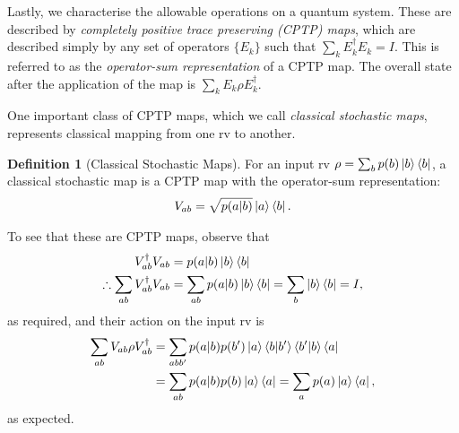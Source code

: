 \documentclass[10pt, a4paper]{article}
\numberwithin{equation}{section} %
\newcounter{stmt} %
\theoremstyle{definition}
\newtheorem{defn}[stmt]{Definition}
\theoremstyle{plain}
\newcommand{\?}{\mathrel{?}} %
\begin{document}
\begin{appendices}
                          Lastly, we characterise the allowable operations on a quantum system. These are described by \emph{completely positive trace preserving (CPTP) maps}, which are described simply by any set of operators \(\{E_k\}\) such that \(\sum_k E_k^{\dagger}E_k = I\). This is referred to as the \emph{operator-sum representation} of a CPTP map. The overall state after the application of the map is \(\sum_k E_k \rho E_k^{\dagger}\).

                          One important class of CPTP maps, which we call \emph{classical stochastic maps}, represents classical mapping from one rv to another. 
                          \begin{defn}[Classical Stochastic Maps]\label{def:classop}
                            For an input rv \(\rho = \sum_b p(b)\ket{b}\bra{b}\), a classical stochastic map is a CPTP map with the operator-sum representation:
                            \begin{align}
                              V_{ab} = \sqrt{p(a|b)}\ket{a}\bra{b}.
                            \end{align}
                          \end{defn}
                          To see that these are CPTP maps, observe that
                          \begin{align*}
                            V_{ab}^{\dagger}V_{ab} &= p(a|b)\ket{b}\bra{b} \\
                            \therefore \sum_{ab} V_{ab}^{\dagger}V_{ab} &= \sum_{ab} p(a|b)\ket{b}\bra{b} = \sum_{b} \ket{b}\bra{b} = I,
                          \end{align*}
                          as required, and their action on the input rv is
                          \begin{align*}
                            \sum_{ab} V_{ab}\rho V_{ab}^{\dagger} &= \sum_{abb'} p(a|b)p(b') \ket{a}\braket{b|b'}\braket{b'|b}\bra{a}  \\
                                                                  &= \sum_{ab} p(a|b)p(b) \ket{a}\bra{a} = \sum_{a} p(a) \ket{a}\bra{a},
                          \end{align*}
                          as expected.


\end{appendices}
\end{document}
